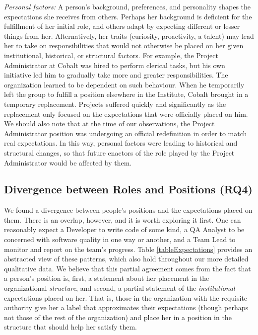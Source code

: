 \documentclass[10pt, conference, compsocconf]{IEEEtran}
\begin{document}
\emph{Personal factors:} A person's background, preferences, and personality shapes the expectations she receives from others. Perhaps her background is deficient for the fulfillment of her initial role, and others adapt by expecting different or lesser things from her. Alternatively, her traits (curiosity, proactivity, a talent) may lead her to take on responsibilities that would not otherwise be placed on her given institutional, historical, or structural factors. For example, the Project Administrator at Cobalt was hired to perform clerical tasks, but his own initiative led him to gradually take more and greater responsibilities. The organization learned to be dependent on such behaviour. When he temporarily left the group to fulfill a position elsewhere in the Institute, Cobalt brought in a temporary replacement. Projects suffered quickly and significantly as the replacement only focused on the expectations that were officially placed on him. We should also note that at the time of our observations, the Project Administrator position was undergoing an official redefinition in order to match real expectations. In this way, personal factors were leading to historical and structural changes, so that future enactors of the role played by the Project Administrator would be affected by them.


\subsection{Divergence between Roles and Positions (RQ4)}

We found a divergence between people's positions and the expectations placed on them. There is an overlap, however, and it is worth exploring it first. One can reasonably expect a Developer to write code of some kind, a QA Analyst to be concerned with software quality in one way or another, and a Team Lead to monitor and report on the team's progress. Table \ref{tableExpectations} provides an abstracted view of these patterns, which also hold throughout our more detailed qualitative data. We believe that this partial agreement comes from the fact that a person's position is, first, a statement about her placement in the organizational \emph{structure}, and second, a partial statement of the \emph{institutional} expectations placed on her. That is, those in the organization with the requisite authority give her a label that approximates their expectations (though perhaps not those of the rest of the organization) and place her in a position in the structure that should help her satisfy them.
\end{document}
